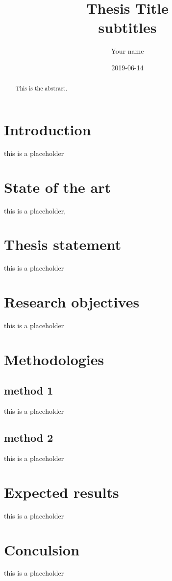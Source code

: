 \documentclass[a4paper,11pt]{article}
\author{Your name}
\date{2019-06-14}
\title{Thesis Title\\\medskip
\large subtitles}
\begin{document}
\maketitle
\begin{abstract}

This is the abstract.

\end{abstract}

\setcounter{tocdepth}{3}
\tableofcontents



\section{Introduction}
\label{sec:orga5253ea}

this is a placeholder


\section{State of the art}
\label{sec:org4c760d8}

this is a placeholder, \cite{kao2017assembly}

\section{Thesis statement}
\label{sec:orga7a2d3b}

this is a placeholder

\section{Research objectives}
\label{sec:org1ac80cd}

this is a placeholder

\section{Methodologies}
\label{sec:org16821ba}

\subsection{method 1}
\label{sec:org0ac3135}
this is a placeholder

\subsection{method 2}
\label{sec:org6d9f345}
this is a placeholder


\section{Expected results}
\label{sec:org8e26fef}

this is a placeholder

\section{Conculsion}
\label{sec:org2bbdcb4}

this is a placeholder


\printbibliography
\end{document}
